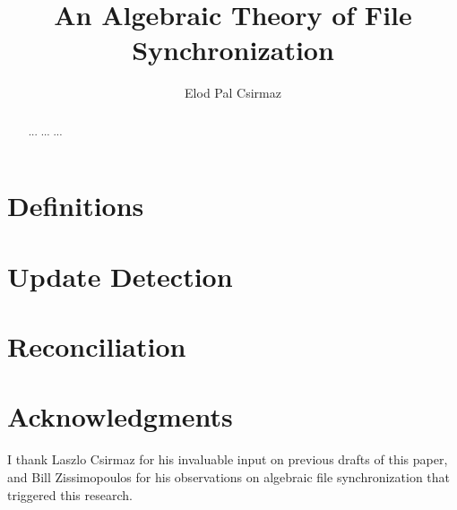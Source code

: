 \documentclass[12pt]{article}
\title{An Algebraic Theory of File Synchronization}
\author{Elod Pal Csirmaz}
\begin{document}
\maketitle
\begin{abstract}
... ... ...
\end{abstract}







\section{Definitions}\label{sec_def}











\section{Update Detection}\label{sec_update}









\section{Reconciliation}\label{sec_rec}





















\section{Acknowledgments}

I thank Laszlo Csirmaz for his invaluable input on previous drafts of this paper,
and Bill Zissimopoulos for his observations on algebraic file synchronization that triggered this research.


\begin{thebibliography}{99}



\end{thebibliography}
\end{document}
